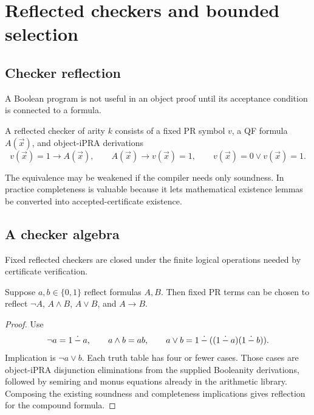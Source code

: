 \section{Reflected checkers and bounded selection}

\subsection{Checker reflection}

A Boolean program is not useful in an object proof until its acceptance
condition is connected to a formula.

\begin{definition}
A reflected checker of arity \(k\) consists of a fixed PR symbol \(v\), a QF
formula \(A(\vec x)\), and object-iPRA derivations
\[
 v(\vec x)=1\to A(\vec x),
 \qquad
 A(\vec x)\to v(\vec x)=1,
 \qquad
 v(\vec x)=0\vee v(\vec x)=1.
\]
\end{definition}

The equivalence may be weakened if the compiler needs only soundness.  In
practice completeness is valuable because it lets mathematical existence
lemmas be converted into accepted-certificate existence.

\subsection{A checker algebra}

Fixed reflected checkers are closed under the finite logical operations needed
by certificate verification.

\begin{proposition}\label{prop:boolean-closure}
Suppose \(a,b\in\{0,1\}\) reflect formulas \(A,B\).  Then fixed PR terms can
be chosen to reflect
\(\neg A\), \(A\wedge B\), \(A\vee B\), and \(A\to B\).
\end{proposition}

\begin{proof}
Use
\[
 \neg a=1\mathbin{\dot{-}} a,
 \qquad
 a\wedge b=ab,
 \qquad
 a\vee b=1\mathbin{\dot{-}}((1\mathbin{\dot{-}} a)(1\mathbin{\dot{-}} b)).
\]
Implication is \(\neg a\vee b\).  Each truth table has four or fewer cases.
Those cases are object-iPRA disjunction eliminations from the supplied
Booleanity derivations, followed by semiring and monus equations already in the
arithmetic library.  Composing the existing soundness and completeness
implications gives reflection for the compound formula.
\end{proof}

